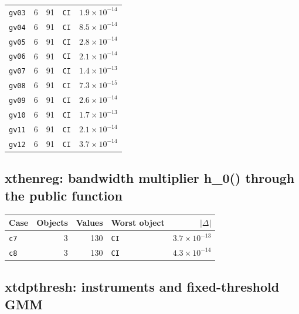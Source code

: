 \documentclass[10.5pt,a4paper]{article}
\begin{document}
\begin{longtable}{@{}p{3.6cm}rrp{4.9cm}r@{}}
\texttt{gv03} & 6 & 91 & \texttt{CI} & $1.9\times10^{-14}$ \\
\texttt{gv04} & 6 & 91 & \texttt{CI} & $8.5\times10^{-14}$ \\
\texttt{gv05} & 6 & 91 & \texttt{CI} & $2.8\times10^{-14}$ \\
\texttt{gv06} & 6 & 91 & \texttt{CI} & $2.1\times10^{-14}$ \\
\texttt{gv07} & 6 & 91 & \texttt{CI} & $1.4\times10^{-13}$ \\
\texttt{gv08} & 6 & 91 & \texttt{CI} & $7.3\times10^{-15}$ \\
\texttt{gv09} & 6 & 91 & \texttt{CI} & $2.6\times10^{-14}$ \\
\texttt{gv10} & 6 & 91 & \texttt{CI} & $1.7\times10^{-13}$ \\
\texttt{gv11} & 6 & 91 & \texttt{CI} & $2.1\times10^{-14}$ \\
\texttt{gv12} & 6 & 91 & \texttt{CI} & $3.7\times10^{-14}$ \\
\bottomrule
\end{longtable}

\subsection*{xthenreg: bandwidth multiplier h\_0() through the public function}

\begin{longtable}{@{}p{3.6cm}rrp{4.9cm}r@{}}
\toprule
Case & Objects & Values & Worst object & $|\Delta|$ \\
\midrule
\endhead
\texttt{c7} & 3 & 130 & \texttt{CI} & $3.7\times10^{-13}$ \\
\texttt{c8} & 3 & 130 & \texttt{CI} & $4.3\times10^{-14}$ \\
\bottomrule
\end{longtable}

\subsection*{xtdpthresh: instruments and fixed-threshold GMM}
\end{document}
